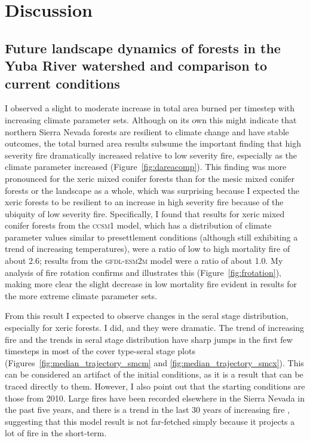 \section{Discussion}


\subsection{Future landscape dynamics of forests in the Yuba River watershed and comparison to current conditions}

I observed a slight to moderate increase in total area burned per timestep with increasing climate parameter sets. Although on its own this might indicate that northern Sierra Nevada forests are resilient to climate change and have stable outcomes, the total burned area results subsume the important finding that high severity fire dramatically increased relative to low severity fire, especially as the climate parameter increased (Figure~\ref{fig:dareacomp}). This finding was more pronounced for the xeric mixed conifer forests than for the mesic mixed conifer forests or the landscape as a whole, which was surprising because I expected the xeric forests to be resilient to an increase in high severity fire because of the ubiquity of low severity fire. Specifically, I found that results for xeric mixed conifer forests from the \textsc{ccsm1} model, which has a distribution of climate parameter values similar to presettlement conditions (although still exhibiting a trend of increasing temperatures), were a ratio of low to high mortality fire of about 2.6; results from the \textsc{gfdl-esm2m} model were a ratio of about 1.0. My analysis of fire rotation confirms and illustrates this (Figure~\ref{fig:frotation}), making more clear the slight decrease in low mortality fire evident in results for the more extreme climate parameter sets.

From this result I expected to observe changes in the seral stage distribution, especially for xeric forests. I did, and they were dramatic. The trend of increasing fire and the trends in seral stage distribution have sharp jumps in the first few timesteps in most of the cover type-seral stage plots (Figures~\ref{fig:median_trajectory_smcm} and \ref{fig:median_trajectory_smcx}). This can be considered an artifact of the initial conditions, as it is a result that can be traced directly to them. However, I also point out that the starting conditions are those from 2010. Large fires have been recorded elsewhere in the Sierra Nevada in the past five years, and there is a trend in the last 30 years of increasing fire \citep{Miller2012}, suggesting that this model result is not far-fetched simply because it projects a lot of fire in the short-term.

